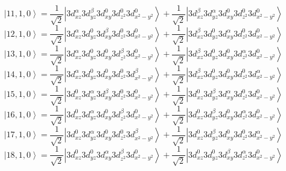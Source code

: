 \documentclass[11pt]{article}
\begin{document}
\begin{equation*}
\left|11,1,0\right>=\frac{1}{\sqrt{2}}\left|3d_{xz}^{\alpha}3d_{yz}^{\beta}3d_{xy}^{0}3d_{z^2}^{0}3d_{x^2-y^2}^{0}\right>+\frac{1}{\sqrt{2}}\left|3d_{xz}^{\beta}3d_{yz}^{\alpha}3d_{xy}^{0}3d_{z^2}^{0}3d_{x^2-y^2}^{0}\right>\end{equation*}
\begin{equation*}
\left|12,1,0\right>=\frac{1}{\sqrt{2}}\left|3d_{xz}^{\alpha}3d_{yz}^{0}3d_{xy}^{\beta}3d_{z^2}^{0}3d_{x^2-y^2}^{0}\right>+\frac{1}{\sqrt{2}}\left|3d_{xz}^{\beta}3d_{yz}^{0}3d_{xy}^{\alpha}3d_{z^2}^{0}3d_{x^2-y^2}^{0}\right>\end{equation*}
\begin{equation*}
\left|13,1,0\right>=\frac{1}{\sqrt{2}}\left|3d_{xz}^{\alpha}3d_{yz}^{0}3d_{xy}^{0}3d_{z^2}^{\beta}3d_{x^2-y^2}^{0}\right>+\frac{1}{\sqrt{2}}\left|3d_{xz}^{\beta}3d_{yz}^{0}3d_{xy}^{0}3d_{z^2}^{\alpha}3d_{x^2-y^2}^{0}\right>\end{equation*}
\begin{equation*}
\left|14,1,0\right>=\frac{1}{\sqrt{2}}\left|3d_{xz}^{\alpha}3d_{yz}^{0}3d_{xy}^{0}3d_{z^2}^{0}3d_{x^2-y^2}^{\beta}\right>+\frac{1}{\sqrt{2}}\left|3d_{xz}^{\beta}3d_{yz}^{0}3d_{xy}^{0}3d_{z^2}^{0}3d_{x^2-y^2}^{\alpha}\right>\end{equation*}
\begin{equation*}
\left|15,1,0\right>=\frac{1}{\sqrt{2}}\left|3d_{xz}^{0}3d_{yz}^{\alpha}3d_{xy}^{\beta}3d_{z^2}^{0}3d_{x^2-y^2}^{0}\right>+\frac{1}{\sqrt{2}}\left|3d_{xz}^{0}3d_{yz}^{\beta}3d_{xy}^{\alpha}3d_{z^2}^{0}3d_{x^2-y^2}^{0}\right>\end{equation*}
\begin{equation*}
\left|16,1,0\right>=\frac{1}{\sqrt{2}}\left|3d_{xz}^{0}3d_{yz}^{\alpha}3d_{xy}^{0}3d_{z^2}^{\beta}3d_{x^2-y^2}^{0}\right>+\frac{1}{\sqrt{2}}\left|3d_{xz}^{0}3d_{yz}^{\beta}3d_{xy}^{0}3d_{z^2}^{\alpha}3d_{x^2-y^2}^{0}\right>\end{equation*}
\begin{equation*}
\left|17,1,0\right>=\frac{1}{\sqrt{2}}\left|3d_{xz}^{0}3d_{yz}^{\alpha}3d_{xy}^{0}3d_{z^2}^{0}3d_{x^2-y^2}^{\beta}\right>+\frac{1}{\sqrt{2}}\left|3d_{xz}^{0}3d_{yz}^{\beta}3d_{xy}^{0}3d_{z^2}^{0}3d_{x^2-y^2}^{\alpha}\right>\end{equation*}
\begin{equation*}
\left|18,1,0\right>=\frac{1}{\sqrt{2}}\left|3d_{xz}^{0}3d_{yz}^{0}3d_{xy}^{\alpha}3d_{z^2}^{\beta}3d_{x^2-y^2}^{0}\right>+\frac{1}{\sqrt{2}}\left|3d_{xz}^{0}3d_{yz}^{0}3d_{xy}^{\beta}3d_{z^2}^{\alpha}3d_{x^2-y^2}^{0}\right>\end{equation*}
\end{document}
